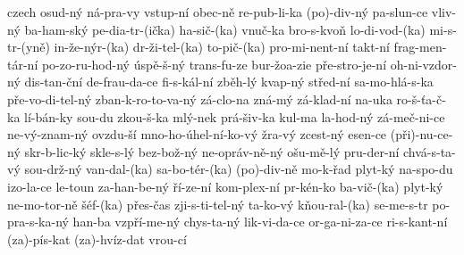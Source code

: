 \begin{hyphenrules}{czech}
{ osud-ný
 ná-pra-vy
 vstup-ní
 obec-ně
 re-pub-li-ka
 (po)-div-ný
 pa-slun-ce
 vliv-ný
 ba-ham-ský
 pe-dia-tr-(ička)
 ha-sič-(ka)
 vnuč-ka
 bro-s-kvoň
 lo-di-vod-(ka)
 mi-s-tr-(yně)
 in-že-nýr-(ka)
 dr-ži-tel-(ka)
 to-pič-(ka)
 pro-mi-nent-ní
 takt-ní
 frag-men-tár-ní
 po-zo-ru-hod-ný
 úspě-š-ný
 trans-fu-ze
 bur-žoa-zie
 pře-stro-je-ní
 oh-ni-vzdor-ný
 dis-tan-ční
 de-frau-da-ce
 fi-s-kál-ní
 zběh-lý
 kvap-ný
 střed-ní
 sa-mo-hlá-s-ka
 pře-vo-di-tel-ný
 zban-k-ro-to-va-ný
 zá-clo-na
 zná-mý
 zá-klad-ní
 na-uka
 ro-š-ťa-č-ka
 lí-bán-ky
 sou-du
 zkou-š-ka
 mlý-nek
 prá-šiv-ka
 kul-ma
 la-hod-ný
 zá-meč-ni-ce
 ne-vý-znam-ný
 ovzdu-ší
 mno-ho-úhel-ní-ko-vý
 žra-vý
 zcest-ný
 esen-ce
 (při)-nu-ce-ný
 skr-b-lic-ký
 skle-s-lý
 bez-bož-ný
 ne-opráv-ně-ný
 ošu-mě-lý
 pru-der-ní
 chvá-s-ta-vý
 sou-drž-ný
 van-dal-(ka)
 sa-bo-tér-(ka)
 (po)-div-ně
 mo-k-řad
 plyt-ký
 na-spo-du
 izo-la-ce
 le-toun
 za-han-be-ný
 ří-ze-ní
 kom-plex-ní
 pr-kén-ko
 ba-vič-(ka)
 plyt-ký
 ne-mo-tor-ně
 šéf-(ka)
 přes-čas
 zji-s-ti-tel-ný
 ta-ko-vý
 kňou-ral-(ka)
 se-me-s-tr
 po-pra-s-ka-ný
 han-ba
 vzpří-me-ný
 chys-ta-ný
 lik-vi-da-ce
 or-ga-ni-za-ce
 ri-s-kant-ní
 (za)-pís-kat
 (za)-hvíz-dat
 vrou-cí
  }
\end{hyphenrules}
